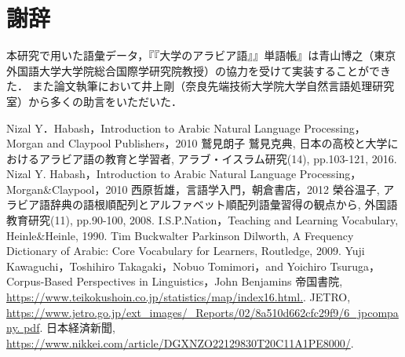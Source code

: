 \documentclass[technicalreport]{ieicej}
\begin{document}
\section{謝辞}
本研究で用いた語彙データ，『『大学のアラビア語』』単語帳』は青山博之（東京外国語大学大学院総合国際学研究院教授）の協力を受けて実装することができた．
また論文執筆において井上剛（奈良先端技術大学院大学自然言語処理研究室）から多くの助言をいただいた．

\begin{thebibliography}{99}
Nizal Y．Habash，Introduction to Arabic Natural Language Processing，Morgan and Claypool Publishers，2010
鷲見朗子 鷲見克典, 日本の高校と大学におけるアラビア語の教育と学習者, アラブ・イスラム研究(14), pp.103-121, 2016.
Nizal Y. Habash，Introduction to Arabic Natural Language Processing，Morgan\&Claypool，2010
西原哲雄，言語学入門，朝倉書店，2012
榮谷温子, アラビア語辞典の語根順配列とアルファベット順配列語彙習得の観点から, 外国語教育研究(11), pp.90-100, 2008.
I.S.P.Nation，Teaching and Learning Vocabulary, Heinle\&Heinle, 1990. 
Tim Buckwalter  Parkinson Dilworth, A Frequency Dictionary of Arabic: Core Vocabulary for Learners, Routledge, 2009.
Yuji Kawaguchi，Toshihiro Takagaki，Nobuo Tomimori，and Yoichiro Tsuruga，
Corpus-Based Perspectives in Linguistics，John Benjamins
帝国書院, \url{https://www.teikokushoin.co.jp/statistics/map/index16.html.}.
JETRO, \url{https://www.jetro.go.jp/ext_images/_Reports/02/8a510d662cfc29f9/6_jpcompany. pdf}.
日本経済新聞, \url{https://www.nikkei.com/article/DGXNZO22129830T20C11A1PE8000/}.
\end{thebibliography}
\end{document}
